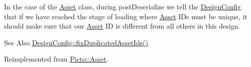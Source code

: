 In the case of the \hyperlink{class_picto_1_1_asset}{Asset} class, during post\-Deserialize we tell the \hyperlink{class_picto_1_1_design_config}{Design\-Config} that if we have reached the stage of loading where \hyperlink{class_picto_1_1_asset}{Asset} I\-Ds must be unique, it should make sure that our \hyperlink{class_picto_1_1_asset}{Asset} I\-D is different from all others in this design. \begin{DoxySeeAlso}{See Also}
\hyperlink{class_picto_1_1_design_config_ab57e0738b97e4358ab09530cd6815fc0}{Design\-Config\-::fix\-Duplicated\-Asset\-Ids()} 
\end{DoxySeeAlso}


Reimplemented from \hyperlink{class_picto_1_1_asset_a40a6b15b05855f8cb392e29d31d80914}{Picto\-::\-Asset}.




